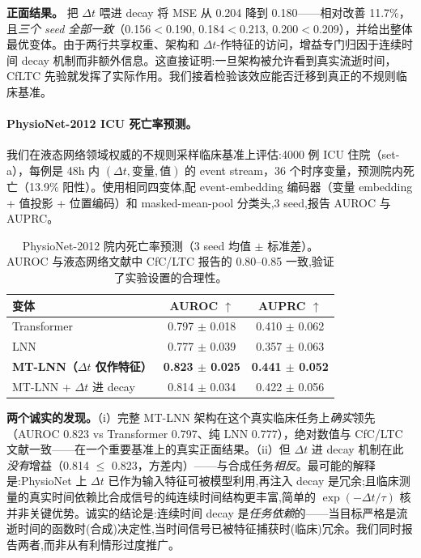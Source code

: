 \documentclass[11pt]{article}
\theoremstyle{definition}
\begin{document}
\textbf{正面结果。} 把 $\Delta t$ 喂进 decay 将 MSE 从 0.204 降到 0.180——相对改善 11.7\%，且\emph{三个 seed 全部一致}（0.156$<$0.190, 0.184$<$0.213, 0.200$<$0.209），并给出整体最优变体。由于两行共享权重、架构和 $\Delta t$-作特征的访问，增益专门归因于连续时间 decay 机制而非额外信息。这直接证明:一旦架构被允许看到真实流逝时间，CfLTC 先验就发挥了实际作用。我们接着检验该效应能否迁移到真正的不规则临床基准。

\paragraph{PhysioNet-2012 ICU 死亡率预测。} 我们在液态网络领域权威的不规则采样临床基准上评估:4000 例 ICU 住院（set-a），每例是 48h 内 $(\Delta t,\text{变量},\text{值})$ 的 event stream，36 个时序变量，预测院内死亡（13.9\% 阳性）。使用相同四变体,配 event-embedding 编码器（变量 embedding + 值投影 + 位置编码）和 masked-mean-pool 分类头,3 seed,报告 AUROC 与 AUPRC。

\begin{table}[h]
\centering
\caption{PhysioNet-2012 院内死亡率预测（3 seed 均值 $\pm$ 标准差）。AUROC 与液态网络文献中 CfC/LTC 报告的 0.80--0.85 一致,验证了实验设置的合理性。}
\label{tab:physionet}
\begin{tabular}{lcc}
\toprule
变体 & AUROC $\uparrow$ & AUPRC $\uparrow$ \\
\midrule
Transformer & 0.797 $\pm$ 0.018 & 0.410 $\pm$ 0.062 \\
LNN & 0.777 $\pm$ 0.039 & 0.357 $\pm$ 0.063 \\
\textbf{MT-LNN（$\Delta t$ 仅作特征）} & \textbf{0.823 $\pm$ 0.025} & \textbf{0.441 $\pm$ 0.052} \\
MT-LNN + $\Delta t$ 进 decay & 0.814 $\pm$ 0.034 & 0.422 $\pm$ 0.056 \\
\bottomrule
\end{tabular}
\end{table}

\textbf{两个诚实的发现。}（i）完整 MT-LNN 架构在这个真实临床任务上\emph{确实}领先（AUROC 0.823 vs Transformer 0.797、纯 LNN 0.777），绝对数值与 CfC/LTC 文献一致——在一个重要基准上的真实正面结果。（ii）但 $\Delta t$ 进 decay 机制在此\emph{没有}增益（0.814 $\le$ 0.823，方差内）——与合成任务\emph{相反}。最可能的解释是:PhysioNet 上 $\Delta t$ 已作为输入特征可被模型利用,再注入 decay 是冗余;且临床测量的真实时间依赖比合成信号的纯连续时间结构更丰富,简单的 $\exp(-\Delta t/\tau)$ 核并非关键优势。诚实的结论是:连续时间 decay 是\emph{任务依赖}的——当目标严格是流逝时间的函数时(合成)决定性,当时间信号已被特征捕获时(临床)冗余。我们同时报告两者,而非从有利情形过度推广。
\end{document}
